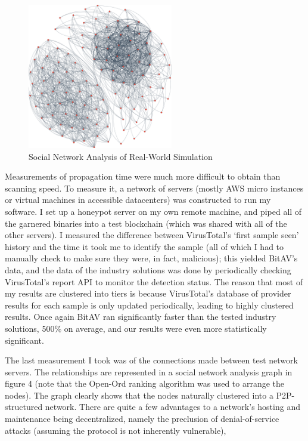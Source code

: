 \documentclass[12pt,journal]{IEEEtran}
\begin{document}
\begin{figure}[!t]
\centering
\includegraphics[width=2.5in]{figures/raster/SNADecRealistic.png}
\caption{Social Network Analysis of Real-World Simulation}
\label{fig_SNA}
\end{figure}

Measurements of propagation time were much more difficult to obtain than scanning speed. To measure it, a network of servers (mostly AWS micro instances or virtual machines in accessible datacenters) was constructed to run my software. I set up a honeypot server on my own remote machine, and piped all of the garnered binaries into a test blockchain (which was shared with all of the other servers). I measured the difference between VirusTotal's ‘first sample seen’ history and the time it took me to identify the sample (all of which I had to manually check to make sure they were, in fact, malicious); this yielded BitAV’s data, and the data of the industry solutions was done by periodically checking VirusTotal's report API to monitor the detection status. The reason that most of my results are clustered into tiers is because VirusTotal's database of provider results for each sample is only updated periodically, leading to highly clustered results. Once again BitAV ran significantly faster than the tested industry solutions, 500\% on average, and our results were even more statistically significant.\par

The last measurement I took was of the connections made between test network servers. The relationships are represented in a social network analysis graph in figure 4 (note that the Open-Ord ranking algorithm was used to arrange the nodes). The graph clearly shows that the nodes naturally clustered into a P2P-structured network. There are quite a few advantages to a network’s hosting and maintenance being decentralized, namely the preclusion of denial-of-service attacks (assuming the protocol is not inherently vulnerable),
\end{document}
